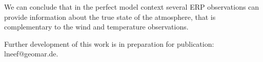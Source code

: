 We can conclude that in the perfect model context
several ERP observations can provide 
information about the true state of the atmosphere,
that is complementary to the wind and temperature observations. 


Further development of this work is in preparation for publication: lneef@geomar.de.
